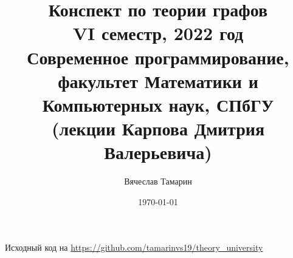 \documentclass[11pt]{book}
\title{Конспект по теории графов\\VI семестр, 2022 год\\
    Современное программирование, факультет Математики и Компьютерных наук, СПбГУ\\
(лекции Карпова Дмитрия Валерьевича)}
\date{\today}
\author{Вячеслав Тамарин}
\begin{document}
\maketitle
\tableofcontents
\hspace{1em}
\begin{center}
	Исходный код на \url{https://github.com/tamarinvs19/theory_university}
\end{center}
 
\end{document}

